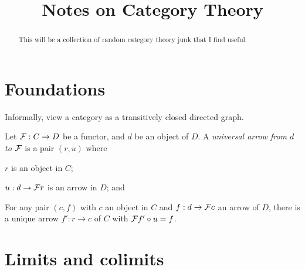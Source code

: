 \documentclass[11pt]{article}
\title{Notes on Category Theory}
\begin{document}
\maketitle
\tableofcontents
\begin{abstract}
    This will be a collection of random category theory junk that I find useful.
\end{abstract}
\section{Foundations}
Informally, view a category as a transitively closed directed graph.

\begin{definition}
    Let $\mathcal{F} : C \to D$ be a functor, and $d$ be an object of $D$. A \emph{universal arrow from $d$ to $\mathcal{F}$} is a pair $(r, u)$ where 
    \begin{enum}
    \item $r$ is an object in $C$;
    \item $u : d \to \mathcal{F} r$ is an arrow in $D$; and
    \item For any pair $(c, f)$ with $c$ an object in $C$ and $f : d \to \mathcal{F} c$ an arrow of $D$, there is a unique arrow $f' : r \to c$ of $C$ with $\mathcal{F} f' \circ u = f$.
    \end{enum}
\end{definition}

\section{Limits and colimits}
\end{document}
